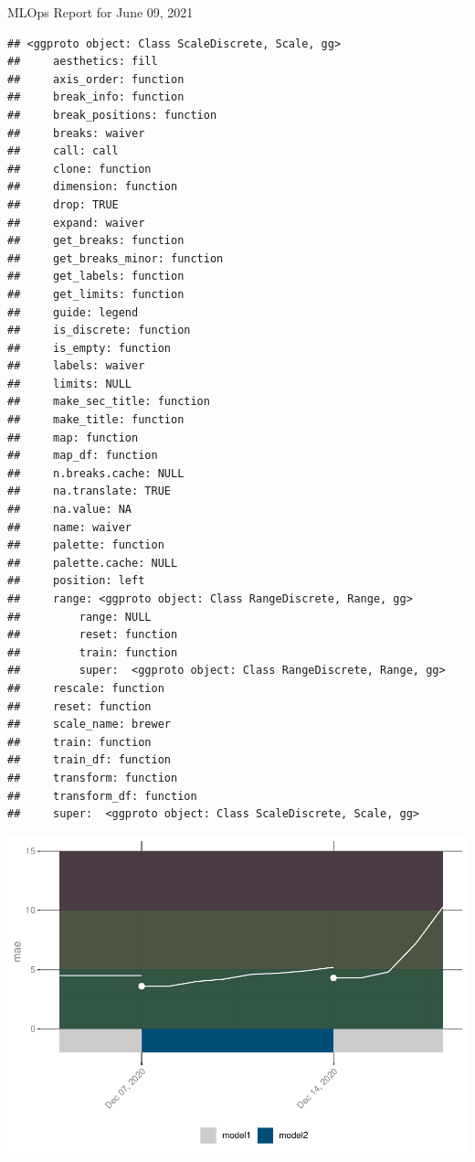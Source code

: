 \documentclass[
]{article}
\author{}
\date{}
\begin{document}

\captionsetup[table]{labelformat=empty}

\huge MLOps Report for June 09, 2021

\begin{verbatim}
## <ggproto object: Class ScaleDiscrete, Scale, gg>
##     aesthetics: fill
##     axis_order: function
##     break_info: function
##     break_positions: function
##     breaks: waiver
##     call: call
##     clone: function
##     dimension: function
##     drop: TRUE
##     expand: waiver
##     get_breaks: function
##     get_breaks_minor: function
##     get_labels: function
##     get_limits: function
##     guide: legend
##     is_discrete: function
##     is_empty: function
##     labels: waiver
##     limits: NULL
##     make_sec_title: function
##     make_title: function
##     map: function
##     map_df: function
##     n.breaks.cache: NULL
##     na.translate: TRUE
##     na.value: NA
##     name: waiver
##     palette: function
##     palette.cache: NULL
##     position: left
##     range: <ggproto object: Class RangeDiscrete, Range, gg>
##         range: NULL
##         reset: function
##         train: function
##         super:  <ggproto object: Class RangeDiscrete, Range, gg>
##     rescale: function
##     reset: function
##     scale_name: brewer
##     train: function
##     train_df: function
##     transform: function
##     transform_df: function
##     super:  <ggproto object: Class ScaleDiscrete, Scale, gg>
\end{verbatim}

\includegraphics{comps_template_files/figure-latex/unnamed-chunk-2-1.pdf}
\end{document}
